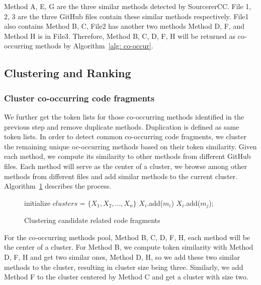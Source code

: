 {\ttt Method A, E, G} are the three similar methods detected by SourcererCC. {\ttt File 1, 2, 3} are the three GitHub files contain these similar methods respectively. 
{\ttt File1} also contains {\ttt Method B, C}, {\ttt File2} has another two methods {\ttt Method D, F}, and {\ttt Method H} is in {\ttt File3}. Therefore, {\ttt Method B, C, D, F, H} will be returned as co-occurring methods by Algorithm~\ref{alg: co-occur}.

\subsection{Clustering and Ranking}
\subsubsection{Cluster co-occurring code fragments}
We further get the token lists for those co-occurring methods identified in the previous step and remove duplicate methods. Duplication is defined as same token lists. In order to detect common co-occurring code fragments, we cluster the remaining unique oc-occurring methods
based on their token similarity. Given each method, we compute its similarity to other methods from different GitHub files. Each method will serve as the center of a cluster, we browse among other methods from different files and add similar methods to the current cluster. Algorithm~\ref{alg: clustering} describes the process.

\begin{figure}[h]
	\removelatexerror
	\begin{algorithm}[H]
		\label{alg: clustering}
		\caption{Clustering candidate related code fragments}
		initialize $clusters$ = $\{X_1, X_2,..., X_n\}$\;
		{
			$X_i$.add($m_i$) \;
			{
				{
					{
						$X_i$.add($m_j$);
					}
				}
			} 
		}
	\end{algorithm}
\end{figure}

For the co-occurring methods pool, {\ttt Method B, C, D, F, H}, each method will be the center of a cluster. For {\ttt Method B}, we compute token similarity with {\ttt Method D, F, H} and get two similar ones, {\ttt Method D, H}, so we add these two similar methods to the cluster, resulting in cluster size being three. Similarly, we add {\ttt Method F} to the cluster centered by {\ttt Method C} and get a cluster with size two.

